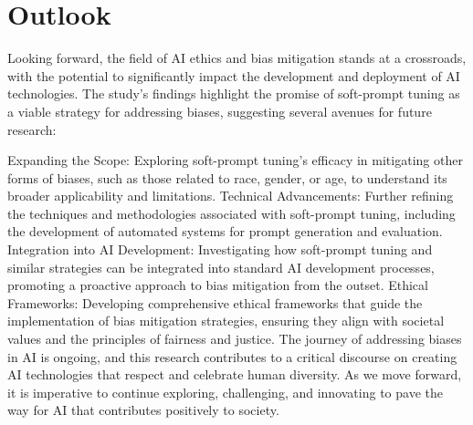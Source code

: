\section{Outlook}

Looking forward, the field of AI ethics and bias mitigation stands at a crossroads, with the potential to significantly impact the development and deployment of AI technologies. The study's findings highlight the promise of soft-prompt tuning as a viable strategy for addressing biases, suggesting several avenues for future research:

Expanding the Scope: Exploring soft-prompt tuning's efficacy in mitigating other forms of biases, such as those related to race, gender, or age, to understand its broader applicability and limitations.
Technical Advancements: Further refining the techniques and methodologies associated with soft-prompt tuning, including the development of automated systems for prompt generation and evaluation.
Integration into AI Development: Investigating how soft-prompt tuning and similar strategies can be integrated into standard AI development processes, promoting a proactive approach to bias mitigation from the outset.
Ethical Frameworks: Developing comprehensive ethical frameworks that guide the implementation of bias mitigation strategies, ensuring they align with societal values and the principles of fairness and justice.
The journey of addressing biases in AI is ongoing, and this research contributes to a critical discourse on creating AI technologies that respect and celebrate human diversity. As we move forward, it is imperative to continue exploring, challenging, and innovating to pave the way for AI that contributes positively to society.